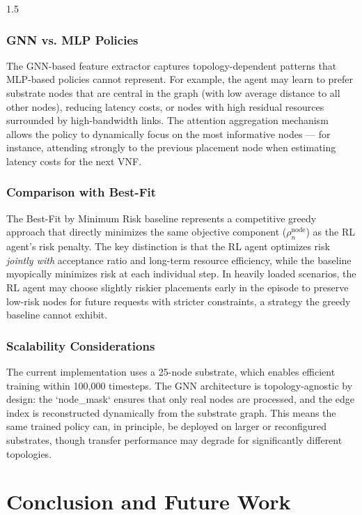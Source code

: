 \documentclass[A4paper,12pt]{report}
\theoremstyle{plain}
\theoremstyle{definition}
\theoremstyle{remark}
\numberwithin{equation}{section}
\begin{document}
\begin{spacing}{1.5}
\subsection{GNN vs. MLP Policies}

The GNN-based feature extractor captures topology-dependent patterns that MLP-based policies cannot represent. For example, the agent may learn to prefer substrate nodes that are central in the graph (with low average distance to all other nodes), reducing latency costs, or nodes with high residual resources surrounded by high-bandwidth links. The attention aggregation mechanism allows the policy to dynamically focus on the most informative nodes — for instance, attending strongly to the previous placement node when estimating latency costs for the next VNF.

\subsection{Comparison with Best-Fit}

The Best-Fit by Minimum Risk baseline represents a competitive greedy approach that directly minimizes the same objective component ($\rho_n^{\text{node}}$) as the RL agent's risk penalty. The key distinction is that the RL agent optimizes risk \textit{jointly with} acceptance ratio and long-term resource efficiency, while the baseline myopically minimizes risk at each individual step. In heavily loaded scenarios, the RL agent may choose slightly riskier placements early in the episode to preserve low-risk nodes for future requests with stricter constraints, a strategy the greedy baseline cannot exhibit.

\subsection{Scalability Considerations}

The current implementation uses a 25-node substrate, which enables efficient training within 100,000 timesteps. The GNN architecture is topology-agnostic by design: the `node\_mask` ensures that only real nodes are processed, and the edge index is reconstructed dynamically from the substrate graph. This means the same trained policy can, in principle, be deployed on larger or reconfigured substrates, though transfer performance may degrade for significantly different topologies.

\chapter{Conclusion and Future Work}


\end{spacing}
\end{document}
